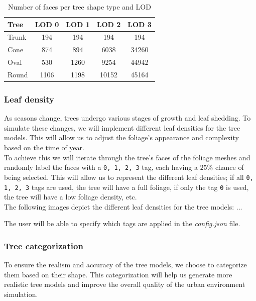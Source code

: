 \documentclass[12pt]{article}
\begin{document}
\begin{table}[H]
    \centering
    \begin{tabular}{|l|c|c|c|c|}
    \hline
    Tree & LOD 0 & LOD 1 & LOD 2 & LOD 3 \\
    \hline
    Trunk & 194 & 194 & 194 & 194 \\
    Cone & 874 & 894 & 6038 & 34260 \\
    Oval & 530 & 1260 & 9254 & 44942 \\
    Round & 1106 & 1198 & 10152 & 45164 \\
    \hline
    \end{tabular}
    \caption{Number of faces per tree shape type and LOD}
    \label{tab:my_label2}
\end{table}

\subsubsection{Leaf density}

As seasons change, trees undergo various stages of growth and leaf shedding.
To simulate these changes, we will implement different leaf densities for the
tree models. This will allow us to adjust the foliage's appearance and
complexity based on the time of year.\\

To achieve this we will iterate through the tree's faces of the foliage meshes 
and randomly label the faces with a \texttt{0, 1, 2, 3} tag, each having a 
$25\%$ chance of being selected. This will allow us to represent the different
leaf densities; if all \texttt{0, 1, 2, 3} tags are used, the tree will have
a full foliage, if only the tag \texttt{0} is used, the tree will have a low
foliage density, etc.\\

The following images depict the different leaf densities for the tree models:
...

The user will be able to specify which tags are applied in the \textit{config.json} 
file.

\subsubsection{Tree categorization}

To ensure the realism and accuracy of the tree models, we choose to categorize
them based on their shape. This categorization will help us
generate more realistic tree models and improve the overall quality of the
urban environment simulation. \\
\end{document}
